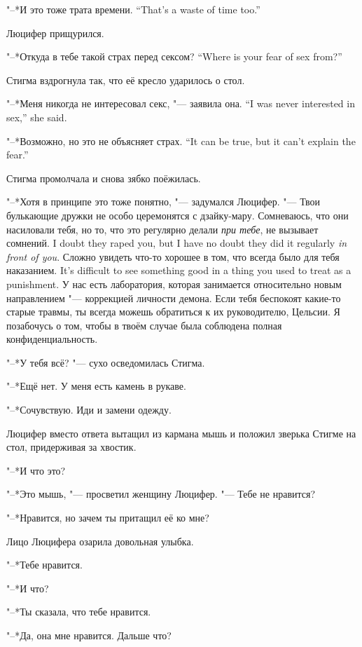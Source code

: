 {"--*И это тоже трата времени.}
{``That's a waste of time too.''}

Люцифер прищурился.

{"--*Откуда в тебе такой страх перед сексом?}
{``Where is your fear of sex from?''}

Стигма вздрогнула так, что её кресло ударилось о стол.

{"--*Меня никогда не интересовал секс, "--- заявила она.}
{``I was never interested in sex,'' she said.}

{"--*Возможно, но это не объясняет страх.}
{``It can be true, but it can't explain the fear.''}

Стигма промолчала и снова зябко поёжилась.

"--*Хотя в принципе это тоже понятно, "--- задумался Люцифер.
"--- Твои булькающие дружки не особо церемонятся с дзайку-мару.
{Сомневаюсь, что они насиловали тебя, но то, что это регулярно делали \emph{при тебе}, не вызывает сомнений.}
{I doubt they raped you, but I have no doubt they did it regularly \emph{in front of you}.}
{Сложно увидеть что-то хорошее в том, что всегда было для тебя наказанием.}
{It's difficult to see something good in a thing you used to treat as a punishment.}
У нас есть лаборатория, которая занимается относительно новым направлением "--- коррекцией личности демона.
Если тебя беспокоят какие-то старые травмы, ты всегда можешь обратиться к их руководителю, Цельсии.
Я позабочусь о том, чтобы в твоём случае была соблюдена полная конфиденциальность.

"--*У тебя всё? "--- сухо осведомилась Стигма.

"--*Ещё нет.
У меня есть камень в рукаве.

"--*Сочувствую.
Иди и замени одежду.

Люцифер вместо ответа вытащил из кармана мышь и положил зверька Стигме на стол, придерживая за хвостик.

"--*И что это?

"--*Это мышь, "--- просветил женщину Люцифер.
"--- Тебе не нравится?

"--*Нравится, но зачем ты притащил её ко мне?

Лицо Люцифера озарила довольная улыбка.

"--*Тебе нравится.

"--*И что?

"--*Ты сказала, что тебе нравится.

"--*Да, она мне нравится.
Дальше что?

